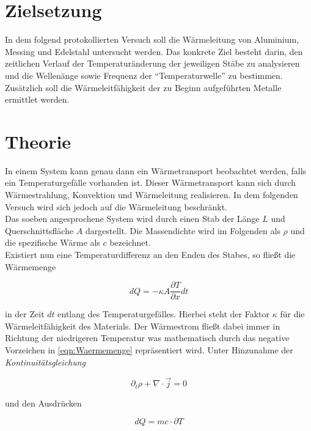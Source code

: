 


\section{Zielsetzung}
\label{sec:Zielsetzung}

In dem folgend protokollierten Versuch soll die Wärmeleitung von
Aluminium, Messing und Edelstahl untersucht werden. Das konkrete Ziel besteht
darin, den zeitlichen Verlauf der Temperaturänderung der jeweiligen Stäbe zu analysieren
und die Wellenänge sowie Frequenz der \enquote{Temperaturwelle} zu bestimmen. Zusätzlich soll
die Wärmeleitfähigkeit der zu Beginn aufgeführten Metalle ermittlet werden.

\section{Theorie}
\label{sec:Theorie}

In einem System kann genau dann ein Wärmetransport beobachtet werden, falls ein Temperaturgefälle vorhanden ist. Dieser Wärmetransport kann sich durch Wärmestrahlung, Konvektion und Wärmeleitung
realisieren. In dem folgenden Versuch wird sich jedoch auf die Wärmeleitung beschränkt. \\
Das soeben angesprochene System wird durch einen Stab der Länge $L$ und Querschnittsfläche $A$ dargestellt.
Die Massendichte wird im Folgenden als $\rho$ und die spezifische Wärme als $c$ bezeichnet. \\
Existiert nun eine Temperaturdifferenz an den Enden des Stabes, so fließt die Wärmemenge

\begin{equation}
\label{eqn:Waermemenge}
    dQ = -\kappa{}A\frac{\partial{}T}{\partial{}x}dt 
\end{equation}

in der Zeit $dt$ entlang des Temperaturgefälles. Hierbei steht der Faktor $\kappa$ für die Wärmeleitfähigkeit
des Materials. Der Wärmestrom fließt dabei immer in Richtung der niedrigeren Temperatur was mathematisch durch 
das negative Vorzeichen in \eqref{eqn:Waermemenge} repräsentiert wird. Unter Hinzunahme der \emph{Kontinuitätsgleichung}

\begin{equation}
    \partial{}_t \rho + \nabla{}\cdot{}\vec{j} = 0
\end{equation}

und den Ausdrücken

\begin{equation}
    dQ = mc \cdot \partial{}T
\end{equation}

